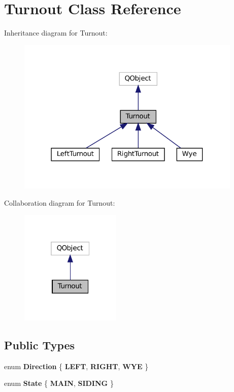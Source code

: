 \hypertarget{classTurnout}{}\section{Turnout Class Reference}
\label{classTurnout}


Inheritance diagram for Turnout\+:
\nopagebreak
\begin{figure}[H]
\begin{center}
\leavevmode
\includegraphics[width=304pt]{classTurnout__inherit__graph}
\end{center}
\end{figure}


Collaboration diagram for Turnout\+:
\nopagebreak
\begin{figure}[H]
\begin{center}
\leavevmode
\includegraphics[width=136pt]{classTurnout__coll__graph}
\end{center}
\end{figure}
\subsection*{Public Types}
\begin{DoxyCompactItemize}
\item 
\mbox{\label{classTurnout_aa7271edc7dd71de1993cb84efb433de4}} 
enum {\bfseries Direction} \{ {\bfseries L\+E\+FT}, 
{\bfseries R\+I\+G\+HT}, 
{\bfseries W\+YE}
 \}
\item 
\mbox{\label{classTurnout_a9b93fecdd78942538e79302c81fcc727}} 
enum {\bfseries State} \{ {\bfseries M\+A\+IN}, 
{\bfseries S\+I\+D\+I\+NG}
 \}
\end{DoxyCompactItemize}
